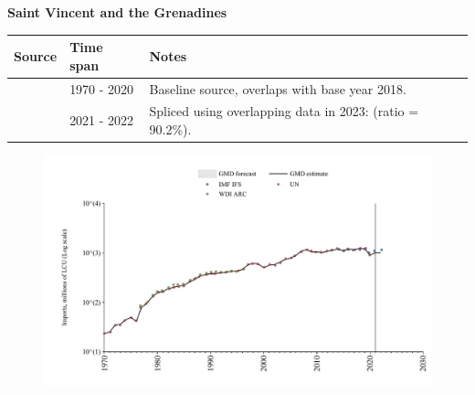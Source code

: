 \documentclass[12pt,a4paper,landscape]{article}
\begin{document}
\begin{adjustbox}{max totalsize={\paperwidth}{\paperheight},center}
\begin{minipage}[t][\textheight][t]{\textwidth}
\vspace*{0.5cm}
{}
\begin{center}
{\Large\bfseries Saint Vincent and the Grenadines}
\end{center}
\vspace{0.5cm}
\begin{table}[H]
\centering
\small
\begin{tabular}{|l|l|l|}
\hline
\textbf{Source} & \textbf{Time span} & \textbf{Notes} \\
\hline
\rowcolor{white}\cite{UN}& 1970 - 2020 &Baseline source, overlaps with base year 2018.\\
\rowcolor{lightgray}\cite{IMF_IFS}& 2021 - 2022 &Spliced using overlapping data in 2023: (ratio = 90.2\%).\\
\hline
\end{tabular}
\end{table}
\begin{figure}[H]
\centering
\includegraphics[width=\textwidth,height=0.6\textheight,keepaspectratio]{graphs/VCT_imports.pdf}
\end{figure}
\end{minipage}
\end{adjustbox}
\end{document}
